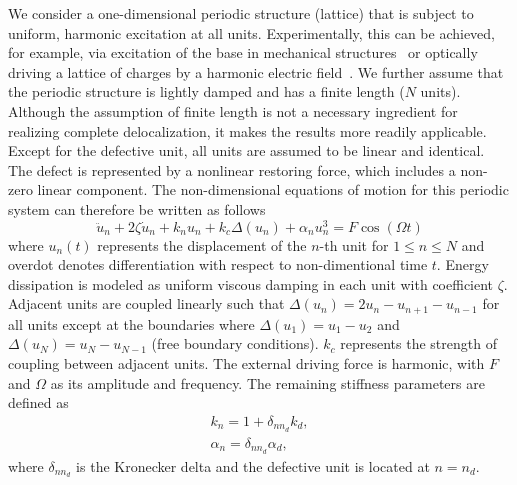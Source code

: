 \documentclass[aps,pre,twocolumn,groupedaddress]{revtex4-1}
\begin{document}
We consider a one-dimensional periodic structure (lattice) that is subject to uniform, harmonic excitation at all units. Experimentally, this can be achieved, for example, via excitation of the base in mechanical structures~\cite{EnglishCuevas} or optically driving a
lattice of charges by a harmonic electric field~\cite{page}. We further assume that the periodic structure is lightly damped and has a finite length ($N$ units). Although the assumption of finite length is not a necessary ingredient for realizing complete delocalization, it makes the results more readily applicable. Except for the defective unit, all units are assumed to be linear and identical. The defect is represented by a nonlinear restoring force, which includes a non-zero linear component. The non-dimensional equations of motion for this periodic system can therefore be written as follows
\begin{equation}
	\label{eq:EOM1}
	\ddot{u}_n + 2 \zeta \dot{u}_n + k_n u_n + k_c \Delta(u_n) + \alpha_n u_n^3 = F \cos(\Omega t)
\end{equation}
where $u_n(t)$ represents the displacement of the $n$-th unit for $1 \le n \le N$ and overdot denotes differentiation with respect to non-dimentional time $t$. Energy dissipation is modeled as uniform viscous damping in each unit with coefficient $\zeta$. Adjacent units are coupled linearly such that $\Delta(u_n)=2u_n-u_{n+1}-u_{n-1}$ for all units except at the boundaries where $\Delta(u_1)=u_1-u_2$ and $\Delta(u_N)=u_N-u_{N-1}$ (free boundary conditions). $k_c$ represents the strength of coupling between adjacent units. The external driving force is harmonic, with $F$ and $\Omega$ as its amplitude and frequency. The remaining stiffness parameters are defined as 
\begin{eqnarray*}
	 k_n         = 1 + \delta_{nn_d} k_d,  \\
	 \alpha_n = \delta_{nn_d} \alpha_d, 
\end{eqnarray*}
where $\delta_{nn_d}$ is the Kronecker delta and the defective unit is located at $n=n_d$. %
\end{document}
